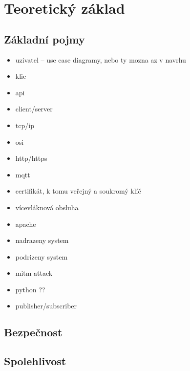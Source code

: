\chapter{Teoretický základ}
\label{sec:te}

\section{Základní pojmy}

\begin{itemize}
    \item uzivatel -- use case diagramy, nebo ty mozna az v navrhu
    \item klic
    \item api
    \item client/server
    \item tcp/ip
    \item osi
    \item http/https
    \item mqtt
    \item certifikát, k tomu veřejný a soukromý klíč
    \item vícevláknová obsluha
    \item apache
    \item nadrazeny system
    \item podrizeny system
    \item mitm attack
    \item python ??
    \item publisher/subscriber
\end{itemize}

\section{Bezpečnost}

\section{Spolehlivost}
